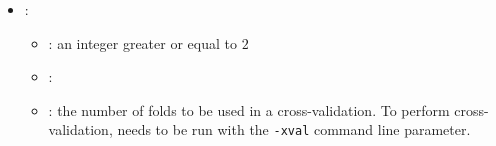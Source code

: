 \begin{itemize}
\begin{itemize}
           \end{itemize}
    \item {}:\label{sett:xval}
           \begin{itemize}
                \item \optionPossibleValues{}: an integer greater or equal to $2$
                \item \optionDefaultValue{}: 
                \item \optionDescrption{}:  the number of folds to be used in a cross-validation.  To perform cross-validation, \clus{} needs to be run with the {\tt -xval} command line parameter.
           \end{itemize}
\end{itemize}